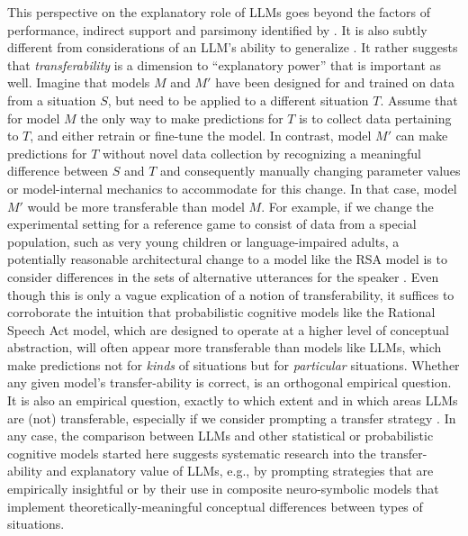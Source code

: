 \documentclass[fleqn]{article}
\begin{document}
This perspective on the explanatory role of LLMs goes beyond the factors of performance, indirect support and parsimony identified by \citet{SortNoopDeemtervan-Deemter2023:Dimensions-of-E}.
It is also subtly different from considerations of an LLM's ability to generalize \citep{HupkesDankers2020:Compositionalit}.
It rather suggests that \emph{transferability} is a dimension to ``explanatory power'' that is important as well.
Imagine that models $M$ and $M'$ have been designed for and trained on data from a situation $S$, but need to be applied to a different situation $T$.
Assume that for model $M$ the only way to make predictions for $T$ is to collect data pertaining to $T$, and either retrain or fine-tune the model.
In contrast, model $M'$ can make predictions for $T$ without novel data collection by recognizing a meaningful difference between $S$ and $T$ and consequently manually changing parameter values or model-internal mechanics to accommodate for this change.
In that case, model $M'$ would be more transferable than model $M$.
For example, if we change the experimental setting for a reference game to consist of data from a special population, such as very young children or language-impaired adults, a potentially reasonable architectural change to a model like the RSA model is to consider differences in the sets of alternative utterances for the speaker \citep[e.g.][]{Noveck2001:When-Children-a}.
Even though this is only a vague explication of a notion of transferability, it suffices to corroborate the intuition that probabilistic cognitive models like the Rational Speech Act model, which are designed to operate at a higher level of conceptual abstraction, will often appear more transferable than models like LLMs, which make predictions not for \emph{kinds} of situations but for \emph{particular} situations.
Whether any given model's transfer-ability is correct, is an orthogonal empirical question.
It is also an empirical question, exactly to which extent and in which areas LLMs are (not) transferable, especially if we consider prompting a transfer strategy \citep{LiuLiu2022:Generated-Knowl,XieRaghunathan2022:An-Explanation-}.
In any case, the comparison between LLMs and other statistical or probabilistic cognitive models started here suggests systematic research into the transfer-ability and explanatory value of LLMs, e.g., by prompting strategies that are empirically insightful or by their use in composite neuro-symbolic models that implement theoretically-meaningful conceptual differences between types of situations.
\end{document}
